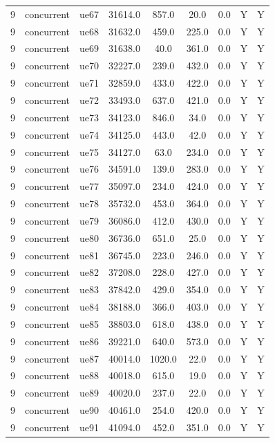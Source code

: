 \begin{table}[ht]
\begin{tabular}{|c|c|c|c|c|c|c|c|c|}
9 & concurrent & ue67 & 31614.0 & 857.0 & 20.0 & 0.0 & Y & Y \\
9 & concurrent & ue68 & 31632.0 & 459.0 & 225.0 & 0.0 & Y & Y \\
9 & concurrent & ue69 & 31638.0 & 40.0 & 361.0 & 0.0 & Y & Y \\
9 & concurrent & ue70 & 32227.0 & 239.0 & 432.0 & 0.0 & Y & Y \\
9 & concurrent & ue71 & 32859.0 & 433.0 & 422.0 & 0.0 & Y & Y \\
9 & concurrent & ue72 & 33493.0 & 637.0 & 421.0 & 0.0 & Y & Y \\
9 & concurrent & ue73 & 34123.0 & 846.0 & 34.0 & 0.0 & Y & Y \\
9 & concurrent & ue74 & 34125.0 & 443.0 & 42.0 & 0.0 & Y & Y \\
9 & concurrent & ue75 & 34127.0 & 63.0 & 234.0 & 0.0 & Y & Y \\
9 & concurrent & ue76 & 34591.0 & 139.0 & 283.0 & 0.0 & Y & Y \\
9 & concurrent & ue77 & 35097.0 & 234.0 & 424.0 & 0.0 & Y & Y \\
9 & concurrent & ue78 & 35732.0 & 453.0 & 364.0 & 0.0 & Y & Y \\
9 & concurrent & ue79 & 36086.0 & 412.0 & 430.0 & 0.0 & Y & Y \\
9 & concurrent & ue80 & 36736.0 & 651.0 & 25.0 & 0.0 & Y & Y \\
9 & concurrent & ue81 & 36745.0 & 223.0 & 246.0 & 0.0 & Y & Y \\
9 & concurrent & ue82 & 37208.0 & 228.0 & 427.0 & 0.0 & Y & Y \\
9 & concurrent & ue83 & 37842.0 & 429.0 & 354.0 & 0.0 & Y & Y \\
9 & concurrent & ue84 & 38188.0 & 366.0 & 403.0 & 0.0 & Y & Y \\
9 & concurrent & ue85 & 38803.0 & 618.0 & 438.0 & 0.0 & Y & Y \\
9 & concurrent & ue86 & 39221.0 & 640.0 & 573.0 & 0.0 & Y & Y \\
9 & concurrent & ue87 & 40014.0 & 1020.0 & 22.0 & 0.0 & Y & Y \\
9 & concurrent & ue88 & 40018.0 & 615.0 & 19.0 & 0.0 & Y & Y \\
9 & concurrent & ue89 & 40020.0 & 237.0 & 22.0 & 0.0 & Y & Y \\
9 & concurrent & ue90 & 40461.0 & 254.0 & 420.0 & 0.0 & Y & Y \\
9 & concurrent & ue91 & 41094.0 & 452.0 & 351.0 & 0.0 & Y & Y \\

\end{tabular}
\end{table}
